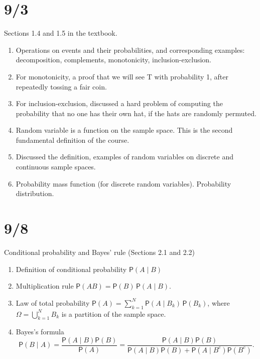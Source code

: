 \documentclass[letterpaper,11pt,oneside,reqno]{amsart}
\numberwithin{equation}{section}
\theoremstyle{definition}
\begin{document}
\section{9/3}

Sections 1.4 and 1.5 in the textbook.

\begin{enumerate}
	\item Operations on events and their probabilities, and 
		corresponding examples: decomposition, complements, monotonicity, inclusion-exclusion.
	\item For monotonicity, a proof that we will see T with probability 1, after repeatedly 
		tossing a fair coin.
	\item For inclusion-exclusion, discussed a hard problem of computing the 
		probability that no one has their own hat, if the hats are randomly permuted.
	\item Random variable is a function on the sample space.
		This is the second fundamental definition 
		of the course.
	\item Discussed the definition, examples of random variables
		on discrete and continuous sample spaces.
	\item Probability mass function (for discrete random variables).
		Probability distribution.
\end{enumerate}

\section{9/8}

Conditional probability and Bayes' rule (Sections 2.1 and 2.2)
\begin{enumerate}
	\item Definition of conditional probability $\mathsf{P}(A\mid B)$
	\item Multiplication rule
		$\mathsf{P}(AB)=\mathsf{P}(B)\, \mathsf{P}(A\mid B)$.
	\item Law of total probability
		$\mathsf{P}(A)=\sum_{k=1}^{N}\mathsf{P}(A\mid B_k)\,\mathsf{P}(B_k)$,
		where $\Omega=\bigcup_{k=1}^{N}B_k$ is a partition of the sample space.
	\item Bayes's formula 
		$$\mathsf{P}(B \mid A)=\frac{\mathsf{P}(A\mid B)\mathsf{P}(B)}{\mathsf{P}(A)}=
		\frac{\mathsf{P}(A\mid B)\mathsf{P}(B)}
		{\mathsf{P}(A\mid B)\mathsf{P}(B)
		+
		\mathsf{P}(A\mid B^c)\mathsf{P}(B^c)}.
		$$
\end{enumerate}
\end{document}
